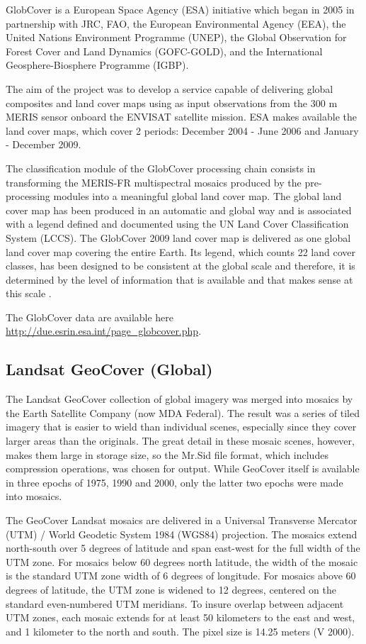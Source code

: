 \documentclass[10pt,b5paper,]{book}
\theoremstyle{definition}
\theoremstyle{definition}
\theoremstyle{definition}
\theoremstyle{remark}
\begin{document}
GlobCover is a European Space Agency (ESA) initiative which began in
2005 in partnership with JRC, FAO, the European Environmental Agency
(EEA), the United Nations Environment Programme (UNEP), the Global
Observation for Forest Cover and Land Dynamics (GOFC-GOLD), and the
International Geosphere-Biosphere Programme (IGBP).

The aim of the project was to develop a service capable of delivering
global composites and land cover maps using as input observations from
the 300 m MERIS sensor onboard the ENVISAT satellite mission. ESA makes
available the land cover maps, which cover 2 periods: December 2004 -
June 2006 and January - December 2009.

The classification module of the GlobCover processing chain consists in
transforming the MERIS-FR multispectral mosaics produced by the
pre-processing modules into a meaningful global land cover map. The
global land cover map has been produced in an automatic and global way
and is associated with a legend defined and documented using the UN Land
Cover Classification System (LCCS). The GlobCover 2009 land cover map is
delivered as one global land cover map covering the entire Earth. Its
legend, which counts 22 land cover classes, has been designed to be
consistent at the global scale and therefore, it is determined by the
level of information that is available and that makes sense at this
scale \citep{bontemps2011globcover}.

The GlobCover data are available here
\url{http://due.esrin.esa.int/page_globcover.php}.

\hypertarget{landsat-geocover-global}{%
\subsection{Landsat GeoCover (Global)}\label{landsat-geocover-global}}

The Landsat GeoCover collection of global imagery was merged into
mosaics by the Earth Satellite Company (now MDA Federal). The result was
a series of tiled imagery that is easier to wield than individual
scenes, especially since they cover larger areas than the originals. The
great detail in these mosaic scenes, however, makes them large in
storage size, so the Mr.Sid file format, which includes compression
operations, was chosen for output. While GeoCover itself is available in
three epochs of 1975, 1990 and 2000, only the latter two epochs were
made into mosaics.

The GeoCover Landsat mosaics are delivered in a Universal Transverse
Mercator (UTM) / World Geodetic System 1984 (WGS84) projection. The
mosaics extend north-south over 5 degrees of latitude and span east-west
for the full width of the UTM zone. For mosaics below 60 degrees north
latitude, the width of the mosaic is the standard UTM zone width of 6
degrees of longitude. For mosaics above 60 degrees of latitude, the UTM
zone is widened to 12 degrees, centered on the standard even-numbered
UTM meridians. To insure overlap between adjacent UTM zones, each mosaic
extends for at least 50 kilometers to the east and west, and 1 kilometer
to the north and south. The pixel size is 14.25 meters (V 2000).
\end{document}
